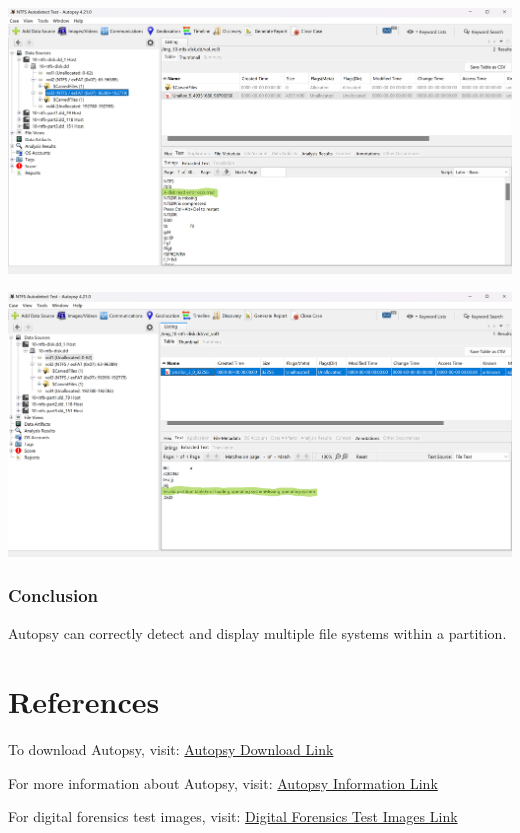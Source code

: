 \documentclass{article}
\begin{document}
\begin{center}
    \includegraphics[width=.85\textwidth]{6/6.5/Autopsy NTFS Autodetect-1.png}
\end{center}

\begin{center}
    \includegraphics[width=.85\textwidth]{6/6.5/Autopsy NTFS Autodetect-2.png}
\end{center}

\subsubsection*{Conclusion}
Autopsy can correctly detect and display multiple file systems within a partition.

\section{References}

To download Autopsy, visit: \href{https://www.autopsy.com/download/}{Autopsy Download Link} 

For more information about Autopsy, visit: \href{http://www.sleuthkit.org/autopsy/}{Autopsy Information Link} 

For digital forensics test images, visit: \href{https://dftt.sourceforge.net/}{Digital Forensics Test Images Link}
\end{document}
